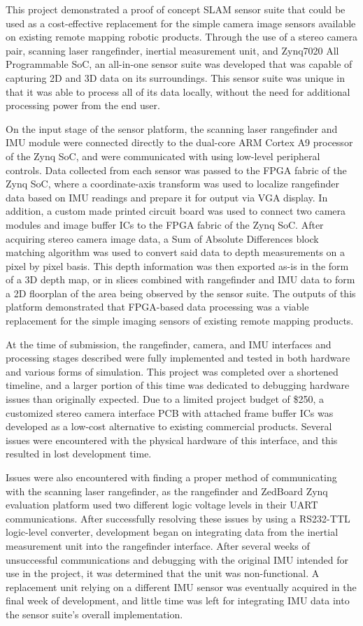 This project demonstrated a proof of concept SLAM sensor suite that could be used as a cost-effective replacement for the simple camera image sensors available on existing remote mapping robotic products. Through the use of a stereo camera pair, scanning laser rangefinder, inertial measurement unit, and Zynq7020 All Programmable SoC, an all-in-one sensor suite was developed that was capable of capturing 2D and 3D data on its surroundings. This sensor suite was unique in that it was able to process all of its data locally, without the need for additional processing power from the end user.
\par
On the input stage of the sensor platform, the scanning laser rangefinder and IMU module were connected directly to the dual-core ARM Cortex A9 processor of the Zynq SoC, and were communicated with using low-level peripheral controls. Data collected from each sensor was passed to the FPGA fabric of the Zynq SoC, where a coordinate-axis transform was used to localize rangefinder data based on IMU readings and prepare it for output via VGA display. In addition, a custom made printed circuit board was used to connect two camera modules and image buffer ICs to the FPGA fabric of the Zynq SoC. After acquiring stereo camera image data, a Sum of Absolute Differences block matching algorithm was used to convert said data to depth measurements on a pixel by pixel basis. This depth information was then exported as-is in the form of a 3D depth map, or in slices combined with rangefinder and IMU data to form a 2D floorplan of the area being observed by the sensor suite. The outputs of this platform demonstrated that FPGA-based data processing was a viable replacement for the simple imaging sensors of existing remote mapping products. 
\par
At the time of submission, the rangefinder, camera, and IMU interfaces and processing stages described were fully implemented and tested in both hardware and various forms of simulation. This project was completed over a shortened timeline, and a larger portion of this time was dedicated to debugging hardware issues than originally expected. Due to a limited project budget of \$250, a customized stereo camera interface PCB with attached frame buffer ICs was developed as a low-cost alternative to existing commercial products. Several issues were encountered with the physical hardware of this interface, and this resulted in lost development time. 
\par
Issues were also encountered with finding a proper method of communicating with the scanning laser rangefinder, as the rangefinder and ZedBoard Zynq evaluation platform used two different logic voltage levels in their UART communications.  After successfully resolving these issues by using a RS232-TTL logic-level converter, development began on integrating data from the inertial measurement unit into the rangefinder interface. After several weeks of unsuccessful communications and debugging with the original IMU intended for use in the project, it was determined that the unit was non-functional. A replacement unit relying on a different IMU sensor was eventually acquired in the final week of development, and little time was left for integrating IMU data into the sensor suite's overall implementation.
